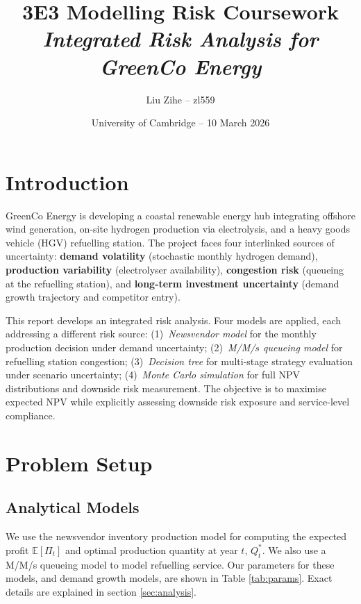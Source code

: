 \documentclass[10pt,a4paper]{article}
\title{3E3 Modelling Risk Coursework \\ \large \textit{Integrated Risk Analysis for GreenCo Energy}}
\author{Liu Zihe -- zl559}
\date{University of Cambridge -- 10 March 2026}
\newcommand{\E}{\mathbb{E}}
\begin{document}
\maketitle

\section{Introduction}

GreenCo Energy is developing a coastal renewable energy hub integrating offshore wind generation, on-site hydrogen production via electrolysis, and a heavy goods vehicle (HGV) refuelling station. The project faces four interlinked sources of uncertainty: \textbf{demand volatility} (stochastic monthly hydrogen demand), \textbf{production variability} (electrolyser availability), \textbf{congestion risk} (queueing at the refuelling station), and \textbf{long-term investment uncertainty} (demand growth trajectory and competitor entry).

This report develops an integrated risk analysis. Four models are applied, each addressing a different risk source: (1)~\textit{Newsvendor model} for the monthly production decision under demand uncertainty; (2)~\textit{M/M/$s$ queueing model} for refuelling station congestion; (3)~\textit{Decision tree} for multi-stage strategy evaluation under scenario uncertainty; (4)~\textit{Monte Carlo simulation} for full NPV distributions and downside risk measurement. The objective is to maximise expected NPV while explicitly assessing downside risk exposure and service-level compliance.

\section{Problem Setup}
\label{sec:setup}

\subsection{Analytical Models}

We use the newsvendor inventory production model for computing the expected profit $\E[\Pi_t]$ and optimal production quantity at year $t$, $Q_t^*$. We also use a M/M/s queueing model to model refuelling service. Our parameters for these models, and demand growth models, are shown in Table \ref{tab:params}. Exact details are explained in section \ref{sec:analysis}.
\end{document}
